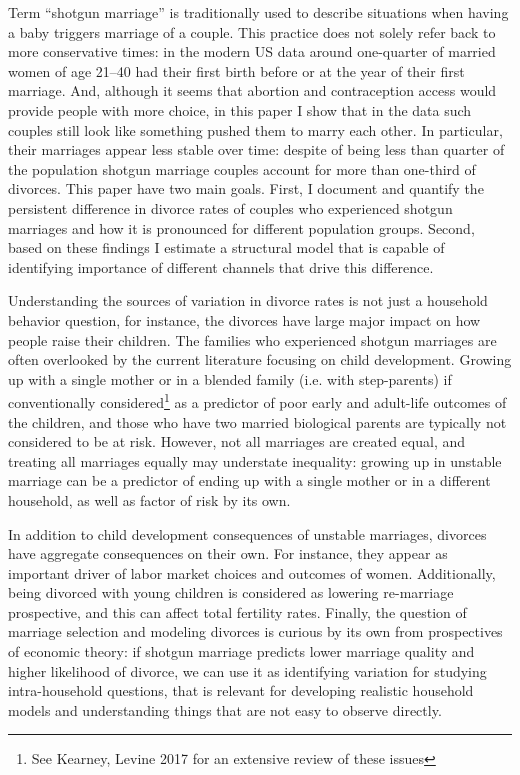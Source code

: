 \documentclass[12pt,letter]{article}
\begin{document}
Term ``shotgun marriage'' is traditionally used to describe situations when having a baby triggers marriage of a couple. This practice does not solely refer back to more conservative times: in the modern US data around one-quarter of married women of age 21--40 had their first birth before or at the year of their first marriage. And, although it seems that abortion and contraception access would provide people with more choice, in this paper I show that in the data such couples still look like something pushed them to marry each other. In particular, their marriages appear less stable over time: despite of being less than quarter of the population shotgun marriage couples account for more than one-third of divorces. This paper have two main goals. First, I document and quantify the persistent difference in divorce rates of couples who experienced shotgun marriages and how it is pronounced for different population groups. Second, based on these findings I estimate a structural model that is capable of identifying importance of different channels that drive this difference.

Understanding the sources of variation in divorce rates is not just a household behavior question, for instance, the divorces have large major impact on how people raise their children. The families who experienced shotgun marriages are often overlooked by the current literature focusing on child development. Growing up with a single mother or in a blended family (i.e. with step-parents) if conventionally considered\footnote{See Kearney, Levine 2017\nocite{kearney} for an extensive review of these issues} as a predictor of poor early and adult-life outcomes of the children, and those who have two married biological parents are typically not considered to be at risk. However, not all marriages are created equal, and treating all marriages equally may understate inequality: growing up in unstable marriage can be a predictor of ending up with a single mother or in a different household, as well as factor of risk by its own.

In addition to child development consequences of unstable marriages, divorces have aggregate consequences on their own. For instance, they appear as important driver of labor market choices and outcomes of women. Additionally, being divorced with young children is considered as lowering re-marriage prospective, and this can affect total fertility rates. Finally, the question of marriage selection and modeling divorces is curious by its own from prospectives of economic theory: if shotgun marriage predicts lower marriage quality and higher likelihood of divorce, we can use it as identifying variation for studying intra-household questions, that is relevant for developing realistic household models and understanding things that are not easy to observe directly.
\end{document}
